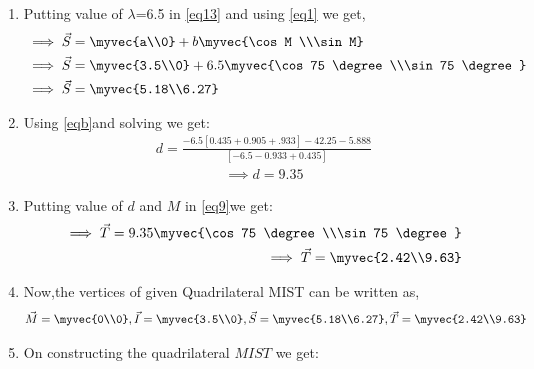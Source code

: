 \documentclass[journal,12pt,twocolumn]{IEEEtran}
\begin{document}
\begin{enumerate}
\begin{proof}
\begin{align}
\text{and  }\vec{T}=d \times{\myvec{\cos M\\ \sin M}}
\end{align}
\end{proof}
\item Putting value of $\lambda$=6.5 in \eqref{eq13} and using \eqref{eq1} we get,
\begin{align}
&\implies \vec{S}=\myvec{a\\0} +b\myvec{\cos M \\\sin M}
\\
&\implies \vec{S}=\myvec{3.5\\0} +6.5\myvec{\cos 75 \degree\\\sin 75 \degree} 
\\
&\implies \vec{S}=\myvec{5.18\\6.27}
\end{align}
\item Using \eqref{eqb}and solving we get:
\begin{align}
d= \frac{-6.5[0.435+0.905+.933]-42.25-5.888}{[-6.5-0.933+0.435]}
\end{align}
\begin{align}
\implies d=9.35
\end{align}
\item Putting value of $d$  and $M$ in \eqref{eq9}we get:
\begin{align}
\implies \vec{T} =9.35\myvec{\cos 75 \degree\\\sin 75 \degree}
\\
\implies \vec{T}=\myvec{2.42\\9.63} 
\end{align}
   \item Now,the vertices of given Quadrilateral MIST can be written as,
\begin{align}
 \vec{M}=\myvec{0\\0},\vec{I} = \myvec{3.5\\0}, \vec{S}=\myvec{5.18\\6.27},\vec{T}=\myvec{2.42\\9.63}
\end{align}
    \item On constructing the quadrilateral $MIST$ we get:
\end{enumerate}
\end{document}
